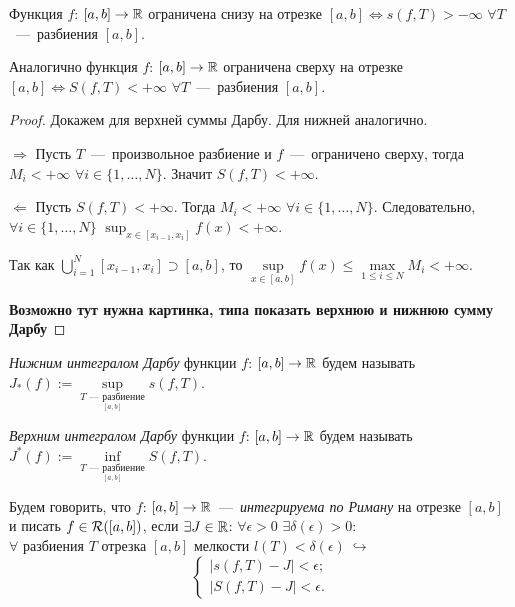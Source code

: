 \begin{lemma}\hypertarget{lemma12.1}{}
    Функция $f$: $[a, b] \rightarrow \mathbb{R}$ ограничена снизу на отрезке $[a, b] \Leftrightarrow s(f, T) > -\infty$  $ \forall T$~---~разбиения $[a, b]$.

    Аналогично функция $f$: $[a, b] \rightarrow \mathbb{R}$ ограничена сверху на отрезке $[a, b] \Leftrightarrow S(f, T) < + \infty$ $\forall T$~---~разбиения $[a, b]$.
\end{lemma}
\begin{proof}
    Докажем для верхней суммы Дарбу. Для нижней аналогично.
    
    \noindent $\Rightarrow$ Пусть $T$~---~произвольное разбиение и $f$~---~ограничено сверху, тогда $M_i < + \infty$ $\forall i \in \{1, \ldots, N\}$. Значит $S(f, T) < +\infty$.

    \noindent $\Leftarrow$ Пусть $S (f, T) < + \infty$. Тогда $M_i < + \infty$ $\forall i \in \{1, \ldots, N\}$. Следовательно, $\forall i \in \{1, \dots, N\}$ $\sup_{x \in [x_{i - 1}, x_i]} f(x) < + \infty$. 

    \noindent Так как $\bigcup\limits_{i = 1}^{N}[x_{i - 1}, x_i] \supset [a, b]$, то $\sup \limits_{x \in [a, b]} f(x) \leq \max \limits_{1 \leq i \leq N} M_i < + \infty$.

    \textbf{Возможно тут нужна картинка, типа показать верхнюю и нижнюю сумму Дарбу}
\end{proof}


\begin{definition}
\textit{Нижним интегралом Дарбу} функции $f$: $[a, b] \rightarrow \mathbb{R}$ будем называть $J_{*} (f) := \sup\limits_{\underset{[a, b]}{T\text{~---~разбиение}}} s (f, T)$.

\textit{Верхним интегралом Дарбу} функции $f$: $[a, b] \rightarrow \mathbb{R}$ будем называть $J^{*} (f) := \inf\limits_{\underset{[a, b]}{T\text{~---~разбиение}}} S (f, T)$.
\end{definition}

\begin{definition}

    Будем говорить, что $f$: $[a, b] \rightarrow \mathbb{R}$~---~\textit{интегрируема по Риману} на отрезке $[a, b]$ и писать $f \in \mathcal{R}([a, b])$, если $\exists J \in \mathbb{R}$: $\forall \epsilon > 0$ $\exists \delta(\epsilon) > 0$: $\forall \text{ разбиения } T \text{ отрезка } [a, b]$ мелкости $l(T) < \delta(\epsilon) \ \hookrightarrow$
    \begin{equation*}
        \begin{cases}
            |s(f, T) - J| < \epsilon; \\ 
            |S(f, T) - J| < \epsilon.
        \end{cases}
    \end{equation*}
\end{definition}

